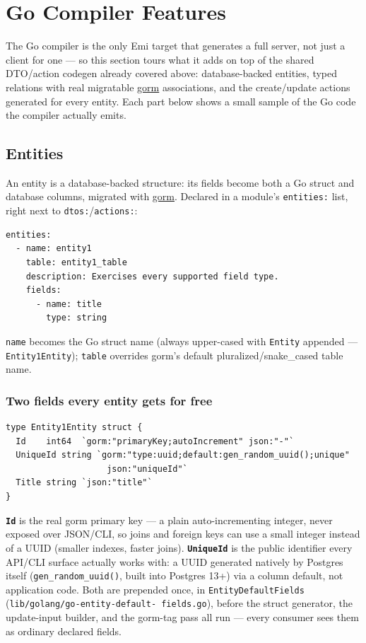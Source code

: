 \section{Go Compiler Features}
\label{sec:go-compiler-features}

The Go compiler is the only Emi target that generates a full server, not
just a client for one --- so this section tours what it adds on top of
the shared DTO/action codegen already covered above: database-backed
entities, typed relations with real migratable \href{https://gorm.io}{gorm}
associations, and the create/update actions generated for every entity.
Each part below shows a small sample of the Go code the compiler actually
emits.

\subsection{Entities}
\label{sec:go-entities}

An entity is a database-backed structure: its fields become both a Go
struct and database columns, migrated with \href{https://gorm.io}{gorm}.
Declared in a module's \texttt{entities:} list, right next to
\texttt{dtos:}/\texttt{actions:}:

\begin{lstlisting}
entities:
  - name: entity1
    table: entity1_table
    description: Exercises every supported field type.
    fields:
      - name: title
        type: string
\end{lstlisting}

\texttt{name} becomes the Go struct name (always upper-cased with
\texttt{Entity} appended --- \texttt{Entity1Entity}); \texttt{table}
overrides gorm's default pluralized/snake\_cased table name.

\subsubsection{Two fields every entity gets for free}
\begin{lstlisting}
type Entity1Entity struct {
  Id    int64  `gorm:"primaryKey;autoIncrement" json:"-"`
  UniqueId string `gorm:"type:uuid;default:gen_random_uuid();unique"
                    json:"uniqueId"`
  Title string `json:"title"`
}
\end{lstlisting}
\textbf{\texttt{Id}} is the real gorm primary key --- a plain
auto-incrementing integer, never exposed over JSON/CLI, so joins and
foreign keys can use a small integer instead of a UUID (smaller indexes,
faster joins). \textbf{\texttt{UniqueId}} is the public identifier every
API/CLI surface actually works with: a UUID generated natively by
Postgres itself (\texttt{gen\_random\_uuid()}, built into Postgres 13+)
via a column default, not application code. Both are prepended once, in
\texttt{EntityDefaultFields} (\texttt{lib/golang/go-entity-default-\allowbreak
fields.go}), before the struct generator, the update-input builder, and
the gorm-tag pass all run --- every consumer sees them as ordinary
declared fields.

